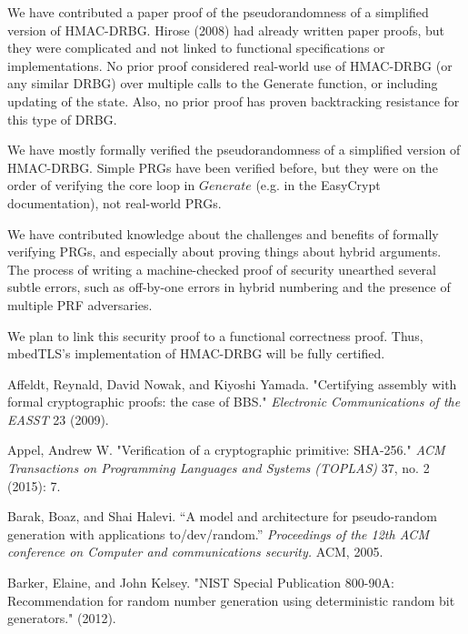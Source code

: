 \documentclass[12pt,lot, lof]{puthesis}
\begin{document}
{We have contributed a paper proof of the pseudorandomness of a simplified version of HMAC-DRBG. Hirose (2008) had already written paper proofs, but they were complicated and not linked to functional specifications or implementations. No prior proof considered real-world use of HMAC-DRBG (or any similar DRBG) over multiple calls to the Generate function, or including updating of the state. Also, no prior proof has proven backtracking resistance for this type of DRBG.

We have mostly formally verified the pseudorandomness of a simplified version of HMAC-DRBG. Simple PRGs have been verified before, but they were on the order of verifying the core loop in $Generate$ (e.g. in the EasyCrypt documentation), not real-world PRGs.

We have contributed knowledge about the challenges and benefits of formally verifying PRGs, and especially about proving things about hybrid arguments. The process of writing a machine-checked proof of security unearthed several subtle errors, such as off-by-one errors in hybrid numbering and the presence of multiple PRF adversaries.

We plan to link this security proof to a functional correctness proof. Thus, mbedTLS's implementation of HMAC-DRBG will be fully certified.




\begin{thebibliography}{99}

Affeldt, Reynald, David Nowak, and Kiyoshi Yamada. "Certifying assembly with formal cryptographic proofs: the case of BBS." \emph{Electronic Communications of the EASST} 23 (2009).

Appel, Andrew W. "Verification of a cryptographic primitive: SHA-256." \emph{ACM Transactions on Programming Languages and Systems (TOPLAS)} 37, no. 2 (2015): 7.

Barak, Boaz, and Shai Halevi. ``A model and architecture for pseudo-random generation with applications to/dev/random.'' \emph{Proceedings of the 12th ACM conference on Computer and communications security.} ACM, 2005. 

Barker, Elaine, and John Kelsey. "NIST Special Publication 800-90A: Recommendation for random number generation using deterministic random bit generators." (2012).


\end{thebibliography}}
\end{document}
